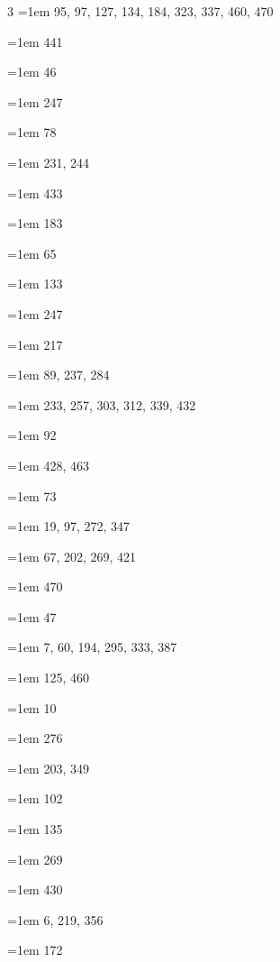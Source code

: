 \begin{multicols}{3}
\hangindent=1em  95, 97, 127, 134, 184, 323, 337, 460, 470\par
\hangindent=1em  441\par
\hangindent=1em  46\par
\hangindent=1em  247\par
\hangindent=1em  78\par
\hangindent=1em  231, 244\par
\hangindent=1em  433\par
\hangindent=1em  183\par
\hangindent=1em  65\par
\hangindent=1em  133\par
\hangindent=1em  247\par
\hangindent=1em  217\par
\hangindent=1em  89, 237, 284\par
\hangindent=1em  233, 257, 303, 312, 339, 432\par
\hangindent=1em  92\par
\hangindent=1em  428, 463\par
\hangindent=1em  73\par
\hangindent=1em  19, 97, 272, 347\par
\hangindent=1em  67, 202, 269, 421\par
\hangindent=1em  470\par
\hangindent=1em  47\par
\hangindent=1em  7, 60, 194, 295, 333, 387\par
\hangindent=1em  125, 460\par
\hangindent=1em  10\par
\hangindent=1em  276\par
\hangindent=1em  203, 349\par
\hangindent=1em  102\par
\hangindent=1em  135\par
\hangindent=1em  269\par
\hangindent=1em  430\par
\hangindent=1em  6, 219, 356\par
\hangindent=1em  172\par

\end{multicols}
